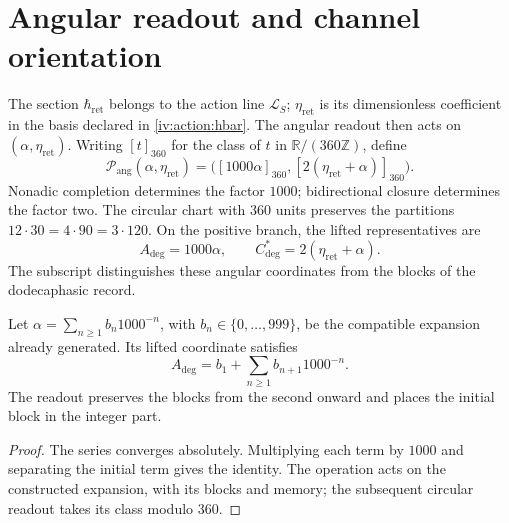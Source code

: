 \section{Angular readout and channel orientation}
\label{iv:angular:section}

The section \(\hbar_{\mathrm{ret}}\) belongs to the action
line \(\mathcal L_S\); \(\eta_{\mathrm{ret}}\) is its
dimensionless coefficient in the basis declared in
\eqref{iv:action:hbar}. The angular readout then acts on
\((\alpha,\eta_{\mathrm{ret}})\). Writing
\([t]_{360}\) for the class of \(t\) in
\(\mathbb R/(360\mathbb Z)\), define
\begin{equation}
 \mathcal P_{\mathrm{ang}}(\alpha,\eta_{\mathrm{ret}})
 =\bigl([1000\alpha]_{360},
        [2(\eta_{\mathrm{ret}}+\alpha)]_{360}\bigr).
 \label{iv:angular:publicacion}
\end{equation}
Nonadic completion determines the factor \(1000\); bidirectional
closure determines the factor two. The circular chart with
\(360\) units preserves the partitions
\(12\cdot30=4\cdot90=3\cdot120\). On the positive branch,
the lifted representatives are
\begin{equation}
 A_{\deg}=1000\alpha,\qquad
 C^*_{\deg}=2(\eta_{\mathrm{ret}}+\alpha).
 \label{iv:angular:representantes}
\end{equation}
The subscript distinguishes these angular coordinates from the
blocks of the dodecaphasic record.

\begin{proposition}
\label{iv:angular:desplazamiento}
Let \(\alpha=\sum_{n\geq1}b_n1000^{-n}\), with
\(b_n\in\{0,\ldots,999\}\), be the compatible expansion
already generated. Its lifted coordinate satisfies
\[
 A_{\deg}=b_1+\sum_{n\geq1}b_{n+1}1000^{-n}.
\]
The readout preserves the blocks from the second onward and
places the initial block in the integer part.
\end{proposition}
\begin{proof}
The series converges absolutely. Multiplying each term by
\(1000\) and separating the initial term gives the identity.
The operation acts on the constructed expansion, with its
blocks and memory; the subsequent circular readout takes
its class modulo \(360\).
\end{proof}


